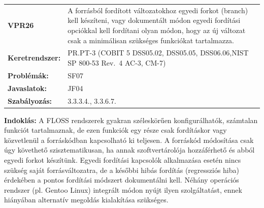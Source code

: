 \documentclass[12pt,magyar,a4paper,oneside]{scrreprt}
\begin{document}
\begin{longtable}[]{@{}ll@{}}
\toprule
\endhead
\begin{minipage}[t]{0.16\columnwidth}\raggedright
\textbf{VPR26}\strut
\end{minipage} & \begin{minipage}[t]{0.79\columnwidth}\raggedright
A forrásból fordított változatokhoz egyedi forkot (branch) kell
készíteni, vagy dokumentált módon egyedi fordítási opciókkal kell
fordítani olyan módon, hogy az új változat csak a minimálisan szükséges
funkciókat tartalmazza.\strut
\end{minipage}\tabularnewline
\begin{minipage}[t]{0.16\columnwidth}\raggedright
\textbf{Keretrendszer:}\strut
\end{minipage} & \begin{minipage}[t]{0.79\columnwidth}\raggedright
PR.PT-3 (COBIT 5 DSS05.02, DSS05.05, DSS06.06,NIST SP 800-53 Rev.~4
AC-3, CM-7)\strut
\end{minipage}\tabularnewline
\begin{minipage}[t]{0.16\columnwidth}\raggedright
\textbf{Problémák:}\strut
\end{minipage} & \begin{minipage}[t]{0.79\columnwidth}\raggedright
SF07\strut
\end{minipage}\tabularnewline
\begin{minipage}[t]{0.16\columnwidth}\raggedright
\textbf{Javaslatok:}\strut
\end{minipage} & \begin{minipage}[t]{0.79\columnwidth}\raggedright
JF04\strut
\end{minipage}\tabularnewline
\begin{minipage}[t]{0.16\columnwidth}\raggedright
\textbf{Szabályozás:}\strut
\end{minipage} & \begin{minipage}[t]{0.79\columnwidth}\raggedright
3.3.3.4., 3.3.6.7.\strut
\end{minipage}\tabularnewline
\bottomrule
\end{longtable}

\textbf{Indoklás: } A FLOSS rendszerek gyakran széleskörűen
konfigurálhatók, számtalan funkciót tartalmaznak, de ezen funkciók egy
része csak fordításkor vagy közvetlenül a forráskódban kapcsolható ki
teljesen. A forráskód módosítása csak úgy követhető szisztematikusan, ha
annak szoftvertárolója hozzáférhető és abból egyedi forkot készítünk.
Egyedi fordítási kapcsolók alkalmazása esetén nincs szükség saját
forrásváltozatra, de a későbbi hibás fordítás (regressziós hiba)
érdekében a pontos fordítási módszert dokumentálni kell. Néhány
operációs rendszer (pl. Gentoo Linux) integrált módon nyújt ilyen
szolgáltatást, ennek hiányában alternatív megoldás kialakítása
szükséges.
\end{document}
